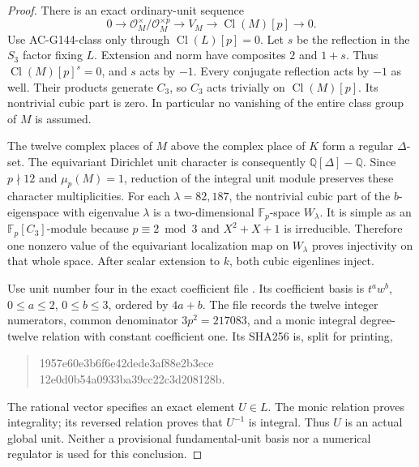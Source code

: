 \begin{proof}
There is an exact ordinary-unit sequence
\[
 0\longrightarrow \mathcal O_M^\times/\mathcal O_M^{\times p}
 \longrightarrow V_M\longrightarrow\operatorname{Cl}(M)[p]
 \longrightarrow0.
 \tag{C16T.19}
\]
Use AC-G144-class only through $\operatorname{Cl}(L)[p]=0$.
Let $s$ be the reflection in the $S_3$ factor fixing $L$.
Extension and norm have composites $2$ and $1+s$.
Thus $\operatorname{Cl}(M)[p]^s=0$, and $s$ acts by $-1$.
Every conjugate reflection acts by $-1$ as well.
Their products generate $C_3$, so $C_3$ acts trivially on
$\operatorname{Cl}(M)[p]$.  Its nontrivial cubic part is zero.
In particular no vanishing of the entire class group of $M$ is assumed.

The twelve complex places of $M$ above the complex place of $K$
form a regular $\Delta$-set.  The equivariant Dirichlet unit
character is consequently $\mathbb Q[\Delta]-\mathbb Q$.
Since $p\nmid12$ and $\mu_p(M)=1$, reduction of the integral unit
module preserves these character multiplicities.
For each $\lambda=82,187$, the nontrivial cubic part of the
$b$-eigenspace with eigenvalue $\lambda$ is a two-dimensional
$\mathbb F_p$-space $W_\lambda$.
It is simple as an $\mathbb F_p[C_3]$-module because
$p\equiv2\bmod3$ and $X^2+X+1$ is irreducible.
Therefore one nonzero value of the equivariant localization
map on $W_\lambda$ proves injectivity on that whole space.
After scalar extension to $k$, both cubic eigenlines inject.

Use unit number four in the exact coefficient file
.
Its coefficient basis is $t^a w^b$, $0\leq a\leq2$,
$0\leq b\leq3$, ordered by $4a+b$.
The file records the twelve integer numerators, common denominator
$3p^2=217083$, and a monic integral degree-twelve relation with
constant coefficient one.  Its SHA256 is, split for printing,
\begin{quote}\ttfamily\small
1957e60e3b6f6e42dede3af88e2b3ece\\
12e0d0b54a0933ba39cc22c3d208128b.
\end{quote}
The rational vector specifies an exact element $U\in L$.
The monic relation proves integrality; its reversed relation proves
that $U^{-1}$ is integral.  Thus $U$ is an actual global unit.
Neither a provisional fundamental-unit basis nor a numerical
regulator is used for this conclusion.


\end{proof}
